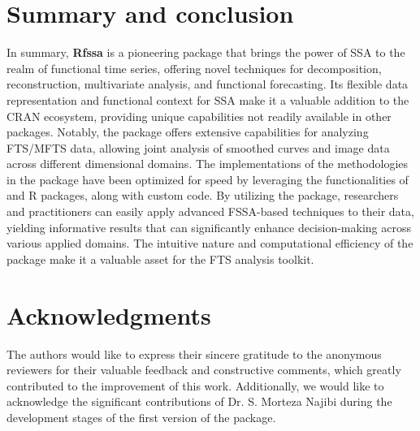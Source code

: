 \section{Summary and conclusion}\label{sec:conclusion}
In summary, \textbf{Rfssa} is a pioneering package that brings the power of SSA to the realm of functional time series, offering novel techniques for decomposition, reconstruction, multivariate analysis, and functional forecasting. Its flexible data representation and functional context for SSA make it a valuable addition to the CRAN ecosystem, providing unique capabilities not readily available in other packages.
Notably, the package offers extensive capabilities for analyzing FTS/MFTS data, allowing joint analysis of smoothed curves and image data across different dimensional domains. The implementations of the methodologies in
the package have been optimized for speed by leveraging the functionalities of 
 and  R packages, along with custom 
 code. By utilizing the  package, researchers and 
practitioners can easily apply advanced FSSA-based techniques to their data, 
yielding informative results that can significantly enhance decision-making across 
various applied domains. The intuitive nature and computational efficiency of the 
package make it a valuable asset for the FTS analysis toolkit.
\section*{Acknowledgments}
The authors would like to express their sincere gratitude to the anonymous reviewers for their valuable feedback and constructive comments, which greatly contributed to the improvement of this work.
Additionally, we would like to acknowledge the significant contributions of Dr. S. Morteza Najibi during the development stages of the first version of the  package. 

\address{Hossein Haghbin\\
	Artificial Intelligence and Data Mining Research Group, ICT Research Institute \\
	Faculty of Intelligent Systems Engineering and Data Science, Persian Gulf University\\ Boushehr, Iran\\
	(ORCiD 0000-0001-8416-2354)\\
	}
\address{Jordan Trinka\\
  Department of Mathematical and Statistical Sciences, Marquette University,\\
  Wisconsin, USA\\
  (ORCiD 0000-0001-9118-5781)\\
  }
\address{Mehdi Maadooliat\\
  Department of Mathematical and Statistical Sciences, Marquette University,\\
  Wisconsin, USA\\
  (ORCiD: 0000-0002-5408-2676)\\
  }
